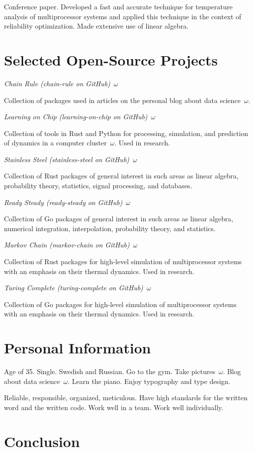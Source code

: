 \documentclass[journal]{IEEEtran}
\begin{document}
Conference paper. Developed a fast and accurate technique for temperature
analysis of multiprocessor systems and applied this technique in the context of
reliability optimization. Made extensive use of linear algebra.

\section{Selected Open-Source Projects}

\emph{Chain Rule (chain-rule on GitHub)~$\omega$}

Collection of packages used in articles on the personal blog about data
science~$\omega$.

\emph{Learning on Chip (learning-on-chip on GitHub)~$\omega$}

Collection of tools in Rust and Python for processing, simulation, and
prediction of dynamics in a computer cluster~$\omega$. Used in research.

\emph{Stainless Steel (stainless-steel on GitHub)~$\omega$}

Collection of Rust packages of general interest in such areas as linear algebra,
probability theory, statistics, signal processing, and databases.

\emph{Ready Steady (ready-steady on GitHub)~$\omega$}

Collection of Go packages of general interest in such areas as linear algebra,
numerical integration, interpolation, probability theory, and statistics.

\emph{Markov Chain (markov-chain on GitHub)~$\omega$}

Collection of Rust packages for high-level simulation of multiprocessor systems
with an emphasis on their thermal dynamics. Used in research.

\emph{Turing Complete (turing-complete on GitHub)~$\omega$}

Collection of Go packages for high-level simulation of multiprocessor systems
with an emphasis on their thermal dynamics. Used in research.

\section{Personal Information}

Age of 35. Single. Swedish and Russian. Go to the gym. Take pictures~$\omega$.
Blog about data science~$\omega$. Learn the piano. Enjoy typography and type
design.

Reliable, responsible, organized, meticulous. Have high standards for the
written word and the written code. Work well in a team. Work well individually.

\section{Conclusion}
\end{document}
